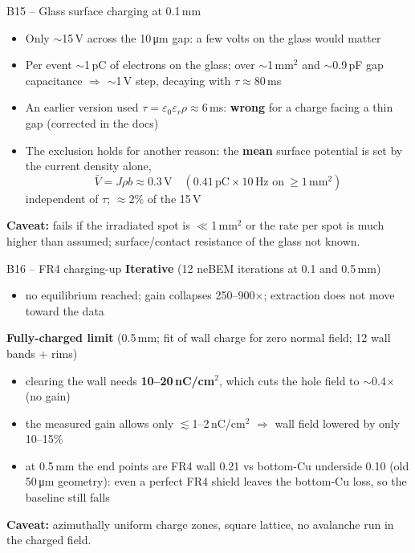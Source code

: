 \documentclass[aspectratio=169,11pt]{beamer}
\newcommand{\backlink}[1]{\hfill\hyperlink{#1}{\beamerreturnbutton{back}}}
\newcommand{\caveat}[1]{{\small\color{warn}\textbf{Caveat:} #1}}
\newcommand{\er}{\varepsilon_r}
\begin{document}
\begin{frame}[label=b-surf]{B15 -- Glass surface charging at 0.1\,mm}
  \small
  \begin{itemize}
    \item Only $\sim$15\,V across the 10\,\si{\micro m} gap: a few volts on the glass would matter
    \item Per event $\sim$1\,pC of electrons on the glass; over $\sim$1\,mm$^2$ and $\sim$0.9\,pF gap capacitance $\Rightarrow$ $\sim$1\,V step, decaying with $\tau\approx80$\,ms
    \item An earlier version used $\tau=\varepsilon_0\er\rho\approx6$\,ms: \textbf{wrong} for a charge facing a thin gap (corrected in the docs)
    \item The exclusion holds for another reason: the \textbf{mean} surface potential is set by the current density alone,
      \[ \bar V = J\rho b \approx 0.3\,\text{V}\quad(0.41\,\text{pC}\times10\,\text{Hz on}\ \ge1\,\text{mm}^2) \]
      independent of $\tau$; $\approx2\%$ of the 15\,V
  \end{itemize}
  \caveat{fails if the irradiated spot is $\ll$1\,mm$^2$ or the rate per spot is much higher than assumed; surface/contact resistance of the glass not known.}
  \backlink{m-ruled}
\end{frame}

\begin{frame}[label=b-fr4]{B16 -- FR4 charging-up}
  \small
  \textbf{Iterative} (12 neBEM iterations at 0.1 and 0.5\,mm)
  \begin{itemize}
    \item no equilibrium reached; gain collapses 250--900$\times$; extraction does not move toward the data
  \end{itemize}
  \textbf{Fully-charged limit} (0.5\,mm; fit of wall charge for zero normal field; 12 wall bands + rims)
  \begin{itemize}
    \item clearing the wall needs \textbf{10--20\,nC/cm$^2$}, which cuts the hole field to $\sim$0.4$\times$ (no gain)
    \item the measured gain allows only $\lesssim$1--2\,nC/cm$^2$ $\Rightarrow$ wall field lowered by only 10--15\%
    \item at 0.5\,mm the end points are FR4 wall 0.21 vs bottom-Cu underside 0.10 (old 50\,\si{\micro m} geometry): even a perfect FR4 shield leaves the bottom-Cu loss, so the baseline still falls
  \end{itemize}
  \caveat{azimuthally uniform charge zones, square lattice, no avalanche run in the charged field.}
  \backlink{m-ruled}
\end{frame}
\end{document}
